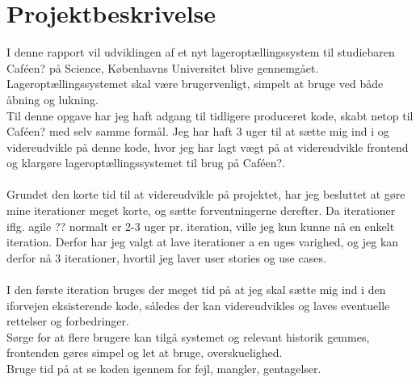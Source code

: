 \documentclass[]{article}
\makeatletter
\renewcommand{\baselinestretch}{1.5}
\newcommand*{\titleGP}{\begingroup 
	\renewcommand{\baselinestretch}{1} 
	\begin{picture}(0, 0) (-390,31)
	\texttt{[image: logo1.png]}
	\end{picture}

	\centering 
	\vspace*{\baselineskip} 
	
	\rule{\textwidth}{1.6pt}\vspace*{-\baselineskip}\vspace*{2pt} %
	\rule{\textwidth}{0.4pt}\\[\baselineskip] %
	
	{\LARGE Eksamen\\  [0.3\baselineskip]
		 Holdnummer C6} \\[0.2\baselineskip] %
	
	\rule{\textwidth}{0.4pt}\vspace*{-\baselineskip}\vspace{3.2pt} %
	\rule{\textwidth}{1.6pt}\\[\baselineskip] %
	
	
	
	
	af \\[\baselineskip]
    {\Large  Camilla Ejsing (smb912@alumni.ku.dk) \\ \left( Nicolai Manique (jpm235@alumni.ku.dk) \& \\ Søren L. Nissen (rhc148@alumni.ku.dk) \right)    \par} %
    {Instruktorer: Alexander Winther Uldall \& \\ (Sven Uhrenholdt Frenzel) \par }
    {GitHub-arkiv: https://github.com/cejsing/Softwareudvikling \par}

	{\itshape Datalogi : Softwareudvikling \par} %
	
	\vfill %
	\vfill
	{\scshape 2016} \\[0.3\baselineskip] %
	{\large }\par %
	
\endgroup}
\makeatother
\begin{document}
\thispagestyle{empty} %
\pagebreak

\tableofcontents
\newpage


\section{Projektbeskrivelse} \label{Projektbeskrivelse}
I denne rapport vil udviklingen af et nyt lageroptællingssystem til studiebaren Caféen? på Science, Københavns Universitet blive gennemgået. \\
Lageroptællingssystemet skal være brugervenligt, simpelt at bruge ved både åbning og lukning. \\
Til denne opgave har jeg haft adgang til tidligere produceret kode, skabt netop til Caféen? med selv samme formål. Jeg har haft 3 uger til at sætte mig ind i og videreudvikle på denne kode, hvor jeg har lagt vægt på at videreudvikle frontend og klargøre lageroptællingssystemet til brug på Caféen?. \\ \\

Grundet den korte tid til at videreudvikle på projektet, har jeg besluttet at gøre mine iterationer meget korte, og sætte forventningerne derefter. Da iterationer iflg. agile ?? normalt er 2-3 uger pr. iteration, ville jeg kun kunne nå en enkelt iteration. Derfor har jeg valgt at lave iterationer a en uges varighed, og jeg kan derfor nå 3 iterationer, hvortil jeg laver user stories og use cases. \\ \\
I den første iteration bruges der meget tid på at jeg skal sætte mig ind i den iforvejen eksisterende kode, således der kan videreudvikles og laves eventuelle rettelser og forbedringer. \\
Sørge for at flere brugere kan tilgå systemet og relevant historik gemmes, frontenden gøres simpel og let at bruge, overskuelighed. \\
Bruge tid på at se koden igennem for fejl, mangler, gentagelser. \\ \\
\end{document}
